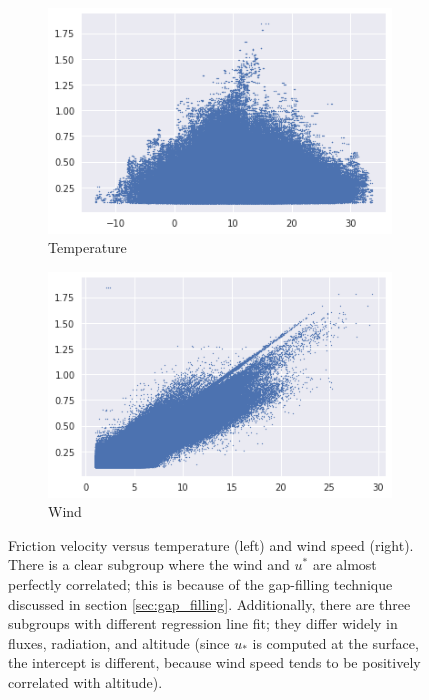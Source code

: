 \documentclass[12pt]{book}
\begin{document}
\begin{figure}
    \centering
    \begin{subfigure}[t]{0.48\textwidth}
        \centering
        \includegraphics[width=\textwidth]{images/ustar_temp}
        \caption{Temperature}
        \label{fig:ustar_temp}
    \end{subfigure}
    \hfill
    \begin{subfigure}[t]{0.48\textwidth}
        \centering
        \includegraphics[width=\textwidth]{images/ustar_wind}
        \caption{Wind}
        \label{fig:ustar_wind}
    \end{subfigure}
    \caption{Friction velocity versus temperature (left) and wind speed (right). There is a clear subgroup where the wind and $u^*$ are almost perfectly correlated; this is because of the gap-filling technique discussed in section \ref{sec:gap_filling}. Additionally, there are three subgroups with different regression line fit; they differ widely in fluxes, radiation, and altitude (since $u_*$ is computed at the surface, the intercept is different, because wind speed tends to be positively correlated with altitude).}
	\label{fig:ustar_wind_temp}
\end{figure}
\end{document}
